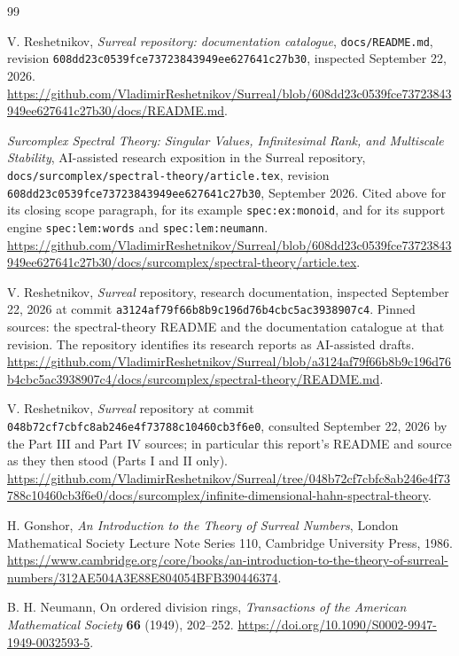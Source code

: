 \documentclass[11pt,a4paper]{article}
\numberwithin{equation}{section}
\theoremstyle{definition}
\theoremstyle{remark}
\newcommand{\commitA}{608dd23c0539fce73723843949ee627641c27b30}
\newcommand{\commitB}{a3124af79f66b8b9c196d76b4cbc5ac3938907c4}
\newcommand{\commitC}{048b72cf7cbfc8ab246e4f73788c10460cb3f6e0}
\begin{document}
\clearpage
{}
{}
\begin{thebibliography}{99}
\raggedright
{}
V. Reshetnikov, \emph{Surreal repository: documentation catalogue},
\texttt{docs/README.md}, revision \texttt{\commitA}, inspected September 22, 2026.
\url{https://github.com/VladimirReshetnikov/Surreal/blob/608dd23c0539fce73723843949ee627641c27b30/docs/README.md}.

\emph{Surcomplex Spectral Theory: Singular Values, Infinitesimal Rank, and
Multiscale Stability}, AI-assisted research exposition in the Surreal
repository, \texttt{docs/surcomplex/spectral-theory/article.tex}, revision
\texttt{\commitA}, September 2026. Cited above for its closing scope
paragraph, for its example \texttt{spec:ex:monoid}, and for its support
engine \texttt{spec:lem:words} and \texttt{spec:lem:neumann}.
\url{https://github.com/VladimirReshetnikov/Surreal/blob/608dd23c0539fce73723843949ee627641c27b30/docs/surcomplex/spectral-theory/article.tex}.

V. Reshetnikov, \emph{Surreal} repository, research documentation,
inspected September 22, 2026 at commit \texttt{\commitB}. Pinned sources:
the spectral-theory README and the documentation catalogue at that revision.
The repository identifies its research reports as AI-assisted drafts.
\url{https://github.com/VladimirReshetnikov/Surreal/blob/a3124af79f66b8b9c196d76b4cbc5ac3938907c4/docs/surcomplex/spectral-theory/README.md}.

V. Reshetnikov, \emph{Surreal} repository at commit \texttt{\commitC},
consulted September 22, 2026 by the Part III and Part IV sources; in
particular this report's README and source as they then stood (Parts I and
II only).
\url{https://github.com/VladimirReshetnikov/Surreal/tree/048b72cf7cbfc8ab246e4f73788c10460cb3f6e0/docs/surcomplex/infinite-dimensional-hahn-spectral-theory}.

H. Gonshor, \emph{An Introduction to the Theory of Surreal Numbers},
London Mathematical Society Lecture Note Series 110, Cambridge University
Press, 1986.
\url{https://www.cambridge.org/core/books/an-introduction-to-the-theory-of-surreal-numbers/312AE504A3E88E804054BFB390446374}.

B. H. Neumann, On ordered division rings,
\emph{Transactions of the American Mathematical Society} \textbf{66}
(1949), 202--252.
\url{https://doi.org/10.1090/S0002-9947-1949-0032593-5}.


\end{thebibliography}
\end{document}

